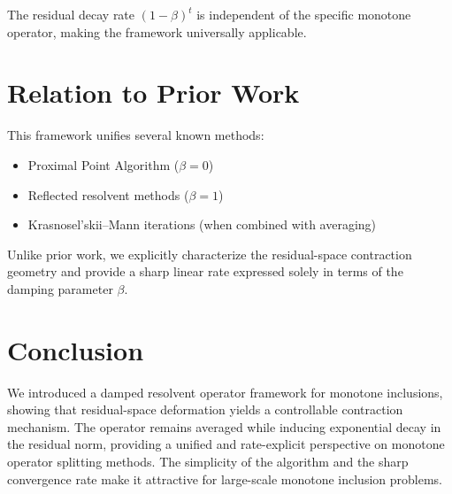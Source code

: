 \documentclass{article}
\begin{document}
The residual decay rate $(1-\beta)^t$ is independent of the specific monotone operator, making the framework universally applicable.

\section{Relation to Prior Work}

This framework unifies several known methods:
\begin{itemize}
\item Proximal Point Algorithm ($\beta=0$)
\item Reflected resolvent methods ($\beta=1$)
\item Krasnosel'skii–Mann iterations (when combined with averaging)
\end{itemize}
Unlike prior work, we explicitly characterize the residual-space contraction geometry and provide a sharp linear rate expressed solely in terms of the damping parameter $\beta$.

\section{Conclusion}

We introduced a damped resolvent operator framework for monotone inclusions, showing that residual-space deformation yields a controllable contraction mechanism. The operator remains averaged while inducing exponential decay in the residual norm, providing a unified and rate-explicit perspective on monotone operator splitting methods. The simplicity of the algorithm and the sharp convergence rate make it attractive for large-scale monotone inclusion problems.
\end{document}
